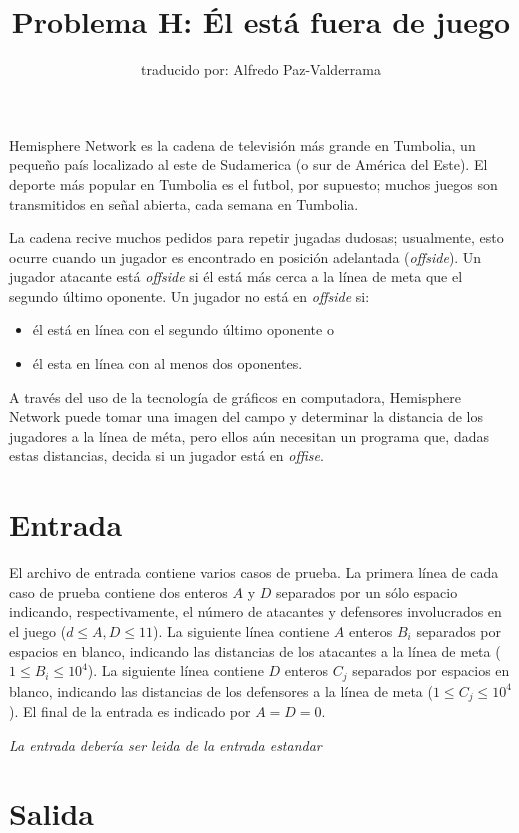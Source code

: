 \documentclass[a4paper,12pt]{article}
\title{Problema H: Él está fuera de juego}
\author{traducido por: Alfredo Paz-Valderrama}
\date{}
\begin{document}
\maketitle
 Hemisphere Network es la cadena de televisión más grande en Tumbolia, un pequeño país localizado al este de Sudamerica (o sur de América del Este). El deporte más popular en Tumbolia es el futbol, por supuesto; muchos juegos son transmitidos en señal abierta, cada semana en Tumbolia.

La cadena recive muchos pedidos para repetir jugadas dudosas; usualmente, esto ocurre cuando un jugador es encontrado en posición adelantada (\emph{offside}). Un jugador atacante está \emph{offside} si él está más cerca a la línea de meta que el segundo último oponente. Un jugador no está en \emph{offside} si:
 \begin{itemize}
  \item él está en línea con el segundo último oponente o
  \item él esta en línea con al menos dos oponentes.
 \end{itemize}

A través del uso de la tecnología de gráficos en computadora, Hemisphere Network puede tomar una imagen del campo y determinar la distancia de los jugadores a la línea de méta, pero ellos aún necesitan un programa que, dadas estas distancias, decida si un jugador está en \emph{offise}.



\section*{Entrada}

El archivo de entrada contiene varios casos de prueba. La primera línea de cada caso de prueba contiene dos enteros $A$ y $D$ separados por un sólo espacio indicando, respectivamente, el número de atacantes y defensores involucrados en el juego ($d \leq A, D \leq 11$). La siguiente línea contiene $A$ enteros $B_i$ separados por espacios en blanco, indicando las distancias de los atacantes a la línea de meta ($1 \leq B_i \leq 10^4$). La siguiente línea contiene $D$ enteros $C_j$ separados por espacios en blanco, indicando las distancias de los defensores a la línea de meta ($1 \leq C_j \leq 10^4$). El final de la entrada es indicado por $A = D = 0$.
 
 \emph{La entrada debería ser leida de la entrada estandar} 

\section*{Salida}
\end{document}
